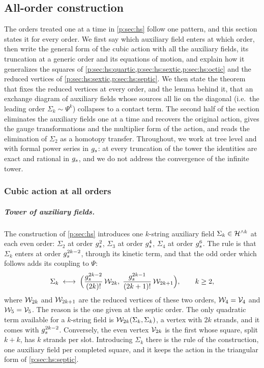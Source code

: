 \subsection{All-order construction}
\label{p:sec:all-orders}



The orders treated one at a time in \cref{p:sec:hs} follow one pattern, and this section states it for every order.
We first say which auxiliary field enters at which order, then write the general form of the cubic action with all the auxiliary fields, its truncation at a generic order and its equations of motion, and explain how it generalizes the squares of \cref{p:sec:hs:quartic,p:sec:hs:sextic,p:sec:hs:octic} and the reduced vertices of \cref{p:sec:hs:sextic,p:sec:hs:septic}.
We then state the theorem that fixes the reduced vertices at every order, and the lemma behind it, that an exchange diagram of auxiliary fields whose sources all lie on the diagonal (i.e.\ the leading order $\Sigma_k \sim \Psi^k$) collapses to a contact term.
The second half of the section eliminates the auxiliary fields one at a time and recovers the original action, gives the gauge transformations and the multiplier form of the action, and reads the elimination of $\Sigma_2$ as a homotopy transfer.
Throughout, we work at tree level and with formal power series in $g_s$: at every truncation of the tower the identities are exact and rational in $g_s$, and we do not address the convergence of the infinite tower.

\subsubsection{Cubic action at all orders}
\label{p:sec:all:action}

\subparagraph{Tower of auxiliary fields.}

The construction of \cref{p:sec:hs} introduces one $k$-string auxiliary field $\Sigma_k \in \mathcal{H}^{\wedge k}$ at each even order: $\Sigma_2$ at order $g_s^2$, $\Sigma_3$ at order $g_s^4$, $\Sigma_4$ at order $g_s^6$.
The rule is that $\Sigma_k$ enters at order $g_s^{2 k - 2}$, through its kinetic term, and that the odd order which follows adds its coupling to $\Psi$:
\begin{equation}
  \label{p:eq:all:counting}
  \Sigma_k
    \;\longleftrightarrow\;
  \Big( \frac{g_s^{2 k - 2}}{(2 k)!} \, \mathcal{W}_{2 k}, \; \frac{g_s^{2 k - 1}}{(2 k + 1)!} \, \mathcal{W}_{2 k + 1} \Big),
  \qquad
  k \ge 2,
\end{equation}
where $\mathcal{W}_{2 k}$ and $\mathcal{W}_{2 k + 1}$ are the reduced vertices of these two orders, $\mathcal{W}_{4} = \mathcal{V}_{4}$ and $\mathcal{W}_{5} = \mathcal{V}_{5}$.
The reason is the one given at the septic order.
The only quadratic term available for a $k$-string field is $\mathcal{W}_{2 k}(\Sigma_k, \Sigma_k)$, a vertex with $2 k$ strands, and it comes with $g_s^{2 k - 2}$.
Conversely, the even vertex $\mathcal{V}_{2 k}$ is the first whose square, split $k + k$, has $k$ strands per slot.
Introducing $\Sigma_k$ there is the rule of the construction, one auxiliary field per completed square, and it keeps the action in the triangular form of \cref{p:sec:hs:septic}.

